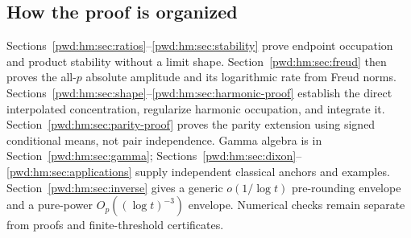 \documentclass[11pt,letterpaper]{article}
\numberwithin{equation}{section}
\theoremstyle{remark}\newtheorem{remark}[theorem]{Remark}
\begin{document}
\subsection{How the proof is organized}
Sections~\ref{pwd:hm:sec:ratios}--\ref{pwd:hm:sec:stability} prove endpoint occupation and product stability without a limit shape. Section~\ref{pwd:hm:sec:freud} then proves the all-$p$ absolute amplitude and its logarithmic rate from Freud norms. Sections~\ref{pwd:hm:sec:shape}--\ref{pwd:hm:sec:harmonic-proof} establish the direct interpolated concentration, regularize harmonic occupation, and integrate it. Section~\ref{pwd:hm:sec:parity-proof} proves the parity extension using signed conditional means, not pair independence. Gamma algebra is in Section~\ref{pwd:hm:sec:gamma}; Sections~\ref{pwd:hm:sec:dixon}--\ref{pwd:hm:sec:applications} supply independent classical anchors and examples. Section~\ref{pwd:hm:sec:inverse} gives a generic $o(1/\log t)$ pre-rounding envelope and a pure-power $O_p((\log t)^{-3})$ envelope. Numerical checks remain separate from proofs and finite-threshold certificates.
\end{document}
